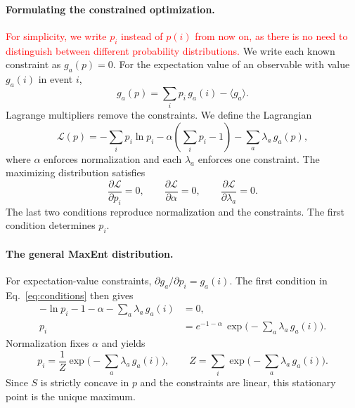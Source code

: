\paragraph{Formulating the constrained optimization.}
\textcolor{red}{For simplicity, we write $p_i$ instead of $p(i)$ from now on,
as there is no need to distinguish between different probability
distributions.}
We write each known constraint as $g_a(p)=0$. For the expectation value of an
observable with value $g_a(i)$ in event $i$,
\begin{equation*}
    g_a(p) = \sum_i p_i\, g_a(i) - \langle g_a\rangle .
\end{equation*}
Lagrange multipliers remove the constraints. We define the Lagrangian
\begin{equation}
    \boxed{\mathcal{L}(p)
    = -\sum_i p_i \ln p_i
    - \alpha\left(\sum_i p_i - 1\right)
    - \sum_a \lambda_a\, g_a(p),}
\end{equation}
where $\alpha$ enforces normalization and each $\lambda_a$ enforces one
constraint. The maximizing distribution satisfies
\begin{equation}
    \boxed{\frac{\partial \mathcal{L}}{\partial p_i} = 0,
    \qquad
    \frac{\partial \mathcal{L}}{\partial \alpha} = 0,
    \qquad
    \frac{\partial \mathcal{L}}{\partial \lambda_a} = 0.}
    \label{eq:conditions}
\end{equation}
The last two conditions reproduce normalization and the constraints. The
first condition determines $p_i$.

\paragraph{The general MaxEnt distribution.}
For expectation-value constraints, $\partial g_a/\partial p_i = g_a(i)$. The
first condition in Eq.~\eqref{eq:conditions} then gives
\begin{align*}
    -\ln p_i - 1 - \alpha - \sum_a \lambda_a\, g_a(i) &= 0, \\
    p_i &= e^{-1-\alpha}\, \exp\!\Big(-\sum_a \lambda_a\, g_a(i)\Big).
\end{align*}
Normalization fixes $\alpha$ and yields
\begin{equation}
    \boxed{p_i = \frac{1}{Z}\exp\!\Big(-\sum_a \lambda_a\, g_a(i)\Big),
    \qquad
    Z = \sum_i \exp\!\Big(-\sum_a \lambda_a\, g_a(i)\Big).}
\end{equation}
Since $S$ is strictly concave in $p$ and the constraints are linear, this
stationary point is the unique maximum.